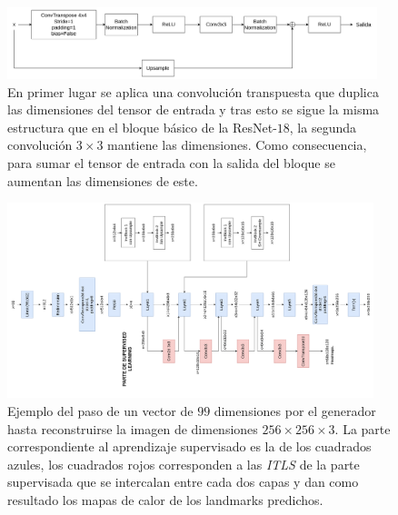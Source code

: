             \begin{figure}[h]
                \centering
                \includegraphics[width=0.96\textwidth]{img/bloque_invresnet.png}
                \caption{En primer lugar se aplica una convolución transpuesta que duplica las dimensiones del tensor de entrada y tras esto se sigue la misma estructura que en el bloque básico de la ResNet-$18$, la segunda convolución $3\times 3$ mantiene las dimensiones. Como consecuencia, para sumar el tensor de entrada con la salida del bloque se aumentan las dimensiones de este.}
                \label{fig:Bloque_Decoder}
            \end{figure}

            \begin{figure}[H]
                \centering
                \includegraphics[width=0.95\textwidth]{img/paso_generator.png}
                \caption{Ejemplo del paso de un vector de $99$ dimensiones por el generador hasta reconstruirse la imagen de dimensiones $256 \times 256 \times 3$. La parte correspondiente al aprendizaje supervisado es la de los cuadrados azules, los cuadrados rojos corresponden a las \textit{ITLS} de la parte supervisada que se intercalan entre cada dos capas y dan como resultado los mapas de calor de los landmarks predichos.}
                \label{fig:Paso_Generator}
            \end{figure}

